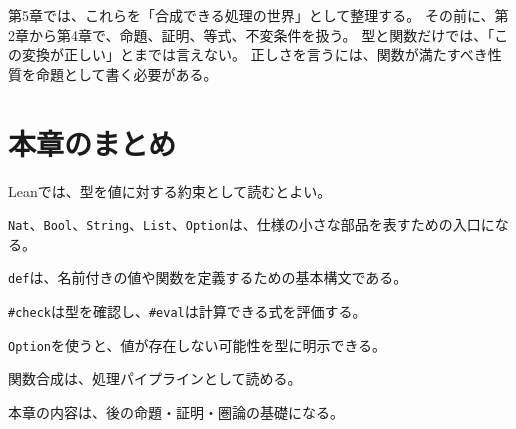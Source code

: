 第5章では、これらを「合成できる処理の世界」として整理する。
その前に、第2章から第4章で、命題、証明、等式、不変条件を扱う。
型と関数だけでは、「この変換が正しい」とまでは言えない。
正しさを言うには、関数が満たすべき性質を命題として書く必要がある。

\section{本章のまとめ}

Leanでは、型を値に対する約束として読むとよい。

\texttt{Nat}、\texttt{Bool}、\texttt{String}、\texttt{List}、\texttt{Option}は、仕様の小さな部品を表すための入口になる。

\texttt{def}は、名前付きの値や関数を定義するための基本構文である。

\texttt{\#check}は型を確認し、\texttt{\#eval}は計算できる式を評価する。

\texttt{Option}を使うと、値が存在しない可能性を型に明示できる。

関数合成は、処理パイプラインとして読める。

本章の内容は、後の命題・証明・圏論の基礎になる。
